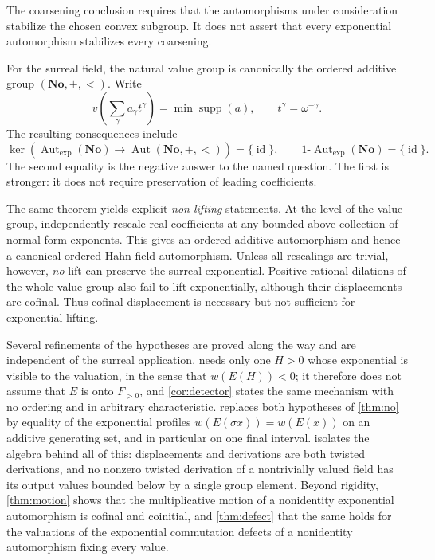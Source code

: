 \documentclass[11pt]{article}
\theoremstyle{definition}
\theoremstyle{remark}
\newcommand{\No}{\mathbf{No}}
\newcommand{\id}{\operatorname{id}}
\newcommand{\Aut}{\operatorname{Aut}}
\newcommand{\supp}{\operatorname{supp}}
\newcommand{\Gexp}{\operatorname{Aut}_{\exp}}
\numberwithin{equation}{section}
\begin{document}
The coarsening conclusion requires that the automorphisms under consideration
stabilize the chosen convex subgroup. It does not assert that every
exponential automorphism stabilizes every coarsening.

For the surreal field, the natural value group is canonically the ordered
additive group $(\No,+,<)$. Write
\[
 v\left(\sum_\gamma a_\gamma t^\gamma\right)
   =\min\supp(a),\qquad t^\gamma=\omega^{-\gamma}.
\]
The resulting consequences include
\begin{equation}\label{eq:main-no}
 \ker\!\left(\Gexp(\No)\longrightarrow\Aut(\No,+,<)\right)=\{\id\},
 \qquad 1\text{-}\Gexp(\No)=\{\id\}.
\end{equation}
The second equality is the negative answer to the named question. The first
is stronger: it does not require preservation of leading coefficients.

The same theorem yields explicit \emph{non-lifting} statements. At the level
of the value group, independently rescale real coefficients at any bounded-above
collection of normal-form exponents. This gives an ordered additive
automorphism and hence a canonical ordered Hahn-field automorphism. Unless
all rescalings are trivial, however, \emph{no} lift can preserve the surreal
exponential. Positive rational dilations of the whole value group also fail
to lift exponentially, although their displacements are cofinal. Thus
cofinal displacement is necessary but not sufficient for exponential lifting.

Several refinements of the hypotheses are proved along the way and are
independent of the surreal application.  needs only
one $H>0$ whose exponential is visible to the valuation, in the sense that
$w(E(H))<0$; it therefore does not assume that $E$ is onto $F_{>0}$, and
\cref{cor:detector} states the same mechanism with no ordering and in
arbitrary characteristic.  replaces both hypotheses of
\cref{thm:no} by equality of the exponential profiles
$w(E(\sigma x))=w(E(x))$ on an additive generating set, and in particular on
one final interval.  isolates the algebra behind
all of this: displacements and derivations are both twisted derivations, and
no nonzero twisted derivation of a nontrivially valued field has its output
values bounded below by a single group element. Beyond rigidity,
\cref{thm:motion} shows that the multiplicative motion of a nonidentity
exponential automorphism is cofinal and coinitial, and \cref{thm:defect}
that the same holds for the valuations of the exponential commutation
defects of a nonidentity automorphism fixing every value.
\end{document}
